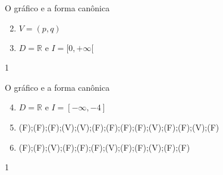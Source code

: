 \clearmargin
\clearmargin
\begin{answer}{O gráfico e a forma canônica}
{
\begin{enumerate}\setcounter{enumi}{1}
\item {} 
\(V=(p,q)\)

\item {} 
\(D=\mathbb{R}\) e \(I=[0,+\infty[\)
\end{enumerate}
}{1}
\end{answer}
\clearmargin
\begin{answer}{O gráfico e a forma canônica}
{
\begin{enumerate}\setcounter{enumi}{3}
\item {} 
\(D=\mathbb{R}\) e \(I=[-\infty,-4]\)

\item {} 
(F);(F);(F);(V);(V);(F);(F);(F);(F);(V);(F);(F);(V);(F)

\item {} 
(F);(F);(V);(F);(F);(F);(V);(F);(F);(V);(F);(F)
\end{enumerate}
}{1}
\end{answer}


